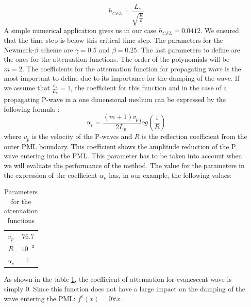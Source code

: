 \begin{equation}
    h_{CFL} = \frac{L_e}{\sqrt{\frac{E}{\rho}}}
\end{equation}
A simple numerical application gives us in our case $h_{CFL} = 0.0412$. We ensured that the time step is below this critical time step.
The parameters for the Newmark-$\beta$ scheme are $\gamma=0.5$ and $\beta=0.25$.
The last parameters to define are the ones for the attenuation functions. The order of the polynomials will be $m=2$. The coefficients for the attenuation function for propagating wave is the most important to define due to its importance for the damping of the wave. If we assume that $\frac{c_s}{L_p}=1$, the coefficient for this function and in the case of a propagating P-wave in a one dimensional medium can be expressed by the following formula \cite{Kucukcoban2}:
\begin{equation}
    \alpha_p = \frac{(m+1)v_p}{2 L_{p}}log\left( \frac{1}{R} \right)
\end{equation}
where $v_p$ is the velocity of the P-waves and $R$ is the reflection coefficient from the outer PML boundary. This coefficient shows the amplitude reduction of the P wave entering into the PML. This parameter has to be taken into account when we will evaluate the performance of the method. The value for the parameters in the expression of the coefficient $\alpha_p$ has, in our example, the following values:
\begin{table}[H]
    \centering
    \begin{tabular}{c|c}
         $v_p$ & $76.7$  \\
         $R$ & $10^{-3}$ \\
         $\alpha_e$ & 1 
    \end{tabular}
    \caption{Parameters for the attenuation functions}
    \label{tab:param_attenuations}
\end{table}
As shown in the table \ref{tab:param_attenuations}, the coefficient of attenuation for evanescent wave is simply $0$. Since this function does not have a large impact on the damping of the wave entering the PML: $f^e(x)=0 \forall x$. 

